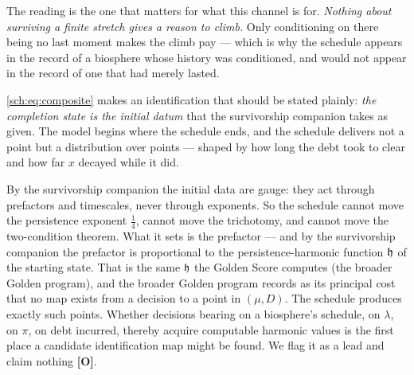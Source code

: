 \begin{remark}
The reading is the one that matters for what this channel is for.
\emph{Nothing about surviving a finite stretch gives a reason to climb.}
Only conditioning on there being no last moment makes the climb pay ---
which is why the schedule appears in the record of a biosphere whose
history was conditioned, and would not appear in the record of one that
had merely lasted.
\end{remark}

\begin{remark}
\label{sch:rem:initialdata}
\eqref{sch:eq:composite} makes an identification that should be stated plainly:
\emph{the completion state is the initial datum} that
the survivorship companion \cite{GoldenSurvivorship} takes as given. The model begins where the
schedule ends, and the schedule delivers not a point but a distribution
over points --- shaped by how long the debt took to clear and how far
$x$ decayed while it did.

By the survivorship companion \cite{GoldenSurvivorship} the initial data are gauge: they act
through prefactors and timescales, never through exponents. So the
schedule cannot move the persistence exponent $\tfrac14$, cannot move
the trichotomy, and cannot move the two-condition theorem. What it sets
is the prefactor --- and by the survivorship companion \cite{GoldenSurvivorship} the prefactor
is proportional to the persistence-harmonic function $\mathfrak{h}$ of the
starting state. That is the same $\mathfrak{h}$ the Golden Score computes
(the broader Golden program), and the broader Golden program records as
its principal cost that no map exists from a decision to a point in
$(\mu,D)$. The schedule produces exactly such points. Whether decisions
bearing on a biosphere's schedule, on $\lambda$, on $\pi$, on debt
incurred, thereby acquire computable harmonic values is the first
place a candidate identification map might be found. We flag it as a
lead and claim nothing \textbf{[O]}.
\end{remark}

